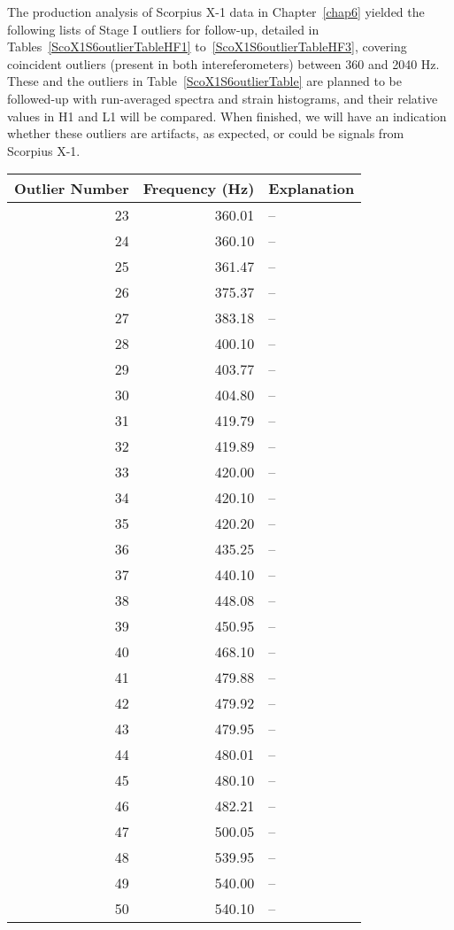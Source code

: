 The production analysis of Scorpius X-1 data in Chapter~\ref{chap6} yielded the following lists of Stage I outliers for follow-up, detailed in Tables~\ref{ScoX1S6outlierTableHF1} to~\ref{ScoX1S6outlierTableHF3}, covering coincident outliers (present in both intereferometers) between 360 and 2040 Hz.
These and the outliers in Table~\ref{ScoX1S6outlierTable} are planned to be followed-up with run-averaged spectra and strain histograms, and their relative values in H1 and L1 will be compared.
When finished, we will have an indication whether these outliers are artifacts, as expected, or could be signals from Scorpius X-1.

\begin{table}
\begin{center}
\begin{tabular}{r r l}
Outlier Number & Frequency (Hz) & Explanation \\
\hline
23 & 360.01  & -- \\
24 & 360.10 & -- \\
25 & 361.47 & -- \\
26 & 375.37 & -- \\
27 & 383.18 & -- \\
28 & 400.10 & -- \\
29 & 403.77 & -- \\
30 & 404.80 & -- \\
31 & 419.79 & -- \\
32 & 419.89 & -- \\
33 & 420.00 & -- \\
34 & 420.10 & -- \\
35 & 420.20 & -- \\
36 & 435.25 & -- \\
37 & 440.10 & -- \\
38 & 448.08 & -- \\
39 & 450.95 & -- \\
40 & 468.10 & -- \\
41 & 479.88 & -- \\
42 & 479.92 & -- \\
43 & 479.95 & -- \\
44 & 480.01 & -- \\
45 & 480.10 & -- \\
46 & 482.21 & -- \\
47 & 500.05 & -- \\
48 & 539.95 & -- \\
49 & 540.00 & -- \\
50 & 540.10 & -- \\

\end{tabular}
\end{center}
\end{table}
